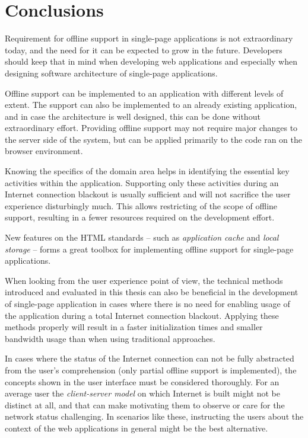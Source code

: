 
\chapter{Conclusions}

Requirement for offline support in single-page applications is not extraordinary today, and the need for it can be expected to grow in the future. Developers should keep that in mind when developing web applications and especially when designing software architecture of single-page applications.

Offline support can be implemented to an application with different levels of extent. The support can also be implemented to an already existing application, and in case the architecture is well designed, this can be done without extraordinary effort. Providing offline support may not require major changes to the server side of the system, but can be applied primarily to the code ran on the browser environment.

Knowing the specifics of the domain area helps in identifying the essential key activities within the application. Supporting only these activities during an Internet connection blackout is usually sufficient and will not sacrifice the user experience disturbingly much. This allows restricting of the scope of offline support, resulting in a fewer resources required on the development effort.

New features on the HTML standards -- such as \textit{application cache} and \textit{local storage} -- forms a great toolbox for implementing offline support for single-page applications. %

When looking from the user experience point of view, the technical methods introduced and evaluated in this thesis can also be beneficial in the development of single-page application in cases where there is no need for enabling usage of the application during a total Internet connection blackout. Applying these methods properly will result in a faster initialization times and smaller bandwidth usage than when using traditional approaches.

In cases where the status of the Internet connection can not be fully abstracted from the user's comprehension (only partial offline support is implemented), the concepts shown in the user interface must be considered thoroughly. For an average user the \textit{client-server model} on which Internet is built might not be distinct at all, and that can make motivating them to observe or care for the network status challenging. In scenarios like these, instructing the users about the context of the web applications in general might be the best alternative.
